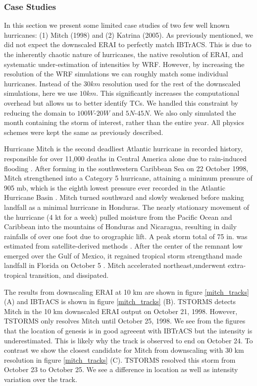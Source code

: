 \subsubsection{Case Studies}
\label{cases}
In this section we present some limited case studies of two few well known hurricanes: (1) Mitch (1998) and (2) Katrina (2005). As previously mentioned, we did not expect the downscaled ERAI to perfectly match IBTrACS. This is due to the inherently chaotic nature of hurricanes, the native resolution of ERAI, and systematic under-estimation of intensities by WRF. However, by increasing the resolution of the WRF simulations we can roughly match some individual hurricanes. Instead of the $30 km$ resolution used for the rest of the downscaled simulations, here we use $10 km$. This significantly increases the computational overhead but allows us to better identify TCs. We handled this constraint by reducing the domain to $100 W$-$20 W$ and $5 N$-$45 N$. We also only simulated the month containing the storm of interest, rather than the entire year. All physics schemes were kept the same as previously described. 

Hurricane Mitch is the second deadliest Atlantic hurricane in recorded history, responsible for over 11,000 deaths in Central America alone due to rain-induced flooding \cite{hellin}.  After forming in the southwestern Caribbean Sea on 22 October 1998, Mitch strengthened into a Category 5 hurricane, attaining a minimum pressure of 905 mb, which is the eighth lowest pressure ever recorded in the Atlantic Hurricane Basin \cite{pasch}.  Mitch turned southward and slowly weakened before making landfall as a minimal hurricane in Honduras.  The nearly stationary movement of the hurricane (4 kt for a week) pulled moisture from the Pacific Ocean and Caribbean into the mountains of Honduras and Nicaragua, resulting in daily rainfalls of over one foot due to orographic lift.  A peak storm total of 75 in. was estimated from satellite-derived methods \cite{hellin}.  After the center of the remnant low emerged over the Gulf of Mexico, it regained tropical storm strengthand made landfall in Florida on October 5 \cite{pasch}.  Mitch accelerated northeast,underwent extra-tropical transition, and dissipated.
\par
The results from downscaling ERAI at 10 km are shown in figure \ref{mitch_tracks} (A) and IBTrACS is shown in figure \ref{mitch_tracks} (B). TSTORMS detects Mitch in the 10 km downscaled ERAI output on October 21, 1998. However, TSTORMS only resolves Mitch until October 25, 1998. We see from the figures that the location of genesis is in good agreeent with IBTrACS but the intensity is underestimated. This is likely why the track is observed to end on October 24. To contrast we show the closest candidate for Mitch from downscaling with 30 km resolution in figure \ref{mitch_tracks} (C). TSTORMS resolved this storm from October 23 to October 25. We see a difference in location as well as intensity variation over the track.  


